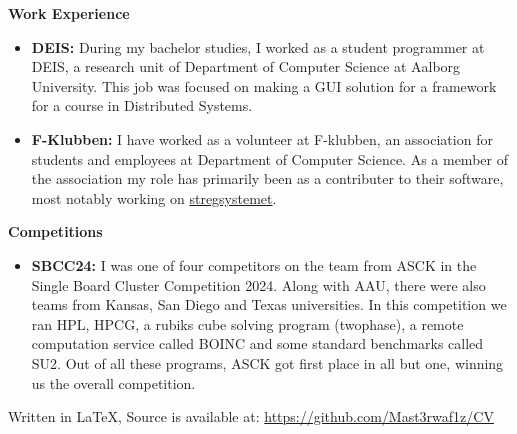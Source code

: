 \documentclass[a4paper, 14pt]{article}
\newcommand{\myitem}[1]{\item[\color{myorange}$\circ$]#1}
\newcommand{\newcvsection}[2]{
    \noindent\huge \textbf{#1} \color{myorange}\hrulefill\color{black}
    
    \normalsize
    #2    
    \vspace{.5cm}
}
\begin{document}
    \newcvsection{Work Experience}{
        \begin{itemize}
            \myitem{
                \textbf{DEIS: } During my bachelor studies, I worked as a student programmer at DEIS, a research unit of Department of Computer Science at Aalborg University. 
                This job was focused on making a GUI solution for a framework for a course in Distributed Systems.
            }
                
            \myitem{
                \textbf{F-Klubben: } I have worked as a volunteer at F-klubben, an association for students and employees at Department of Computer Science. 
                As a member of the association my role has primarily been as a contributer to their software, most notably working on \href{https://github.com/f-klubben/stregsystemet}{stregsystemet}.
            }
        \end{itemize}
    }

    \newcvsection{Competitions}{
        \begin{itemize}
            \myitem{
                \textbf{SBCC24: } I was one of four competitors on the team from ASCK in the Single Board Cluster Competition 2024.
                Along with AAU, there were also teams from Kansas, San Diego and Texas universities.
                In this competition we ran HPL, HPCG, a rubiks cube solving program (twophase), a remote computation service called BOINC and some standard benchmarks called SU2.
                Out of all these programs, ASCK got first place in all but one, winning us the overall competition.
            }
        \end{itemize}
    }

    \vspace*{\fill}
    \tiny Written in \LaTeX, Source is available at: \href{https://github.com/Mast3rwaf1z/CV}{https://github.com/Mast3rwaf1z/CV}
\end{document}
